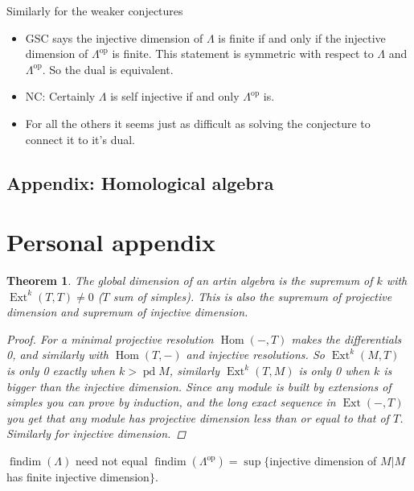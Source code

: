 \documentclass[11pt, a4paper, english]{article}
\newtheorem{theorem}{Theorem}[section]
\theoremstyle{definition}
\DeclareMathOperator{\Hom}{Hom}
\DeclareMathOperator{\Ext}{Ext}
\DeclareMathOperator{\findim}{findim}
\DeclareMathOperator{\pd}{pd}
\begin{document}
Similarly for the weaker conjectures
\begin{itemize}
	\item GSC says the injective dimension of $\Lambda$ is finite if and only if the injective dimension of $\Lambda^{\operatorname{op}}$ is finite. This statement is symmetric with respect to $\Lambda$ and $\Lambda^{\operatorname{op}}$. So the dual is equivalent.
	\item NC: Certainly $\Lambda$ is self injective if and only $\Lambda^{\operatorname{op}}$ is. 
	\item For all the others it seems just as difficult as solving the conjecture to connect it to it's dual.
\end{itemize}

\begin{appendices}
\section{Appendix: Homological algebra}\label{sec:appendix}

\end{appendices}

\section{Personal appendix}
\begin{theorem}
	The global dimension of an artin algebra is the supremum of $k$ with $\Ext^k(T,T)\neq 0$ ($T$ sum of simples). This is also the supremum of projective dimension and supremum of injective dimension.
	\begin{proof}
		For a minimal projective resolution $\Hom(-,T)$ makes the differentials 0, and similarly with $\Hom(T,-)$ and injective resolutions. So $\Ext^k(M, T)$ is only 0 exactly when $k>\pd M$, similarly $\Ext^k(T,M)$ is only 0 when $k$ is bigger than the injective dimension. Since any module is built by extensions of simples you can prove by induction, and the long exact sequence in $\Ext(-,T)$ you get that any module has projective dimension less than or equal to that of $T$. Similarly for injective dimension.
	\end{proof}
\end{theorem}

$\findim(\Lambda)$ need not equal $\findim(\Lambda^{\operatorname{op}}) = \sup\{ $injective dimension of $M | M$ has finite injective dimension$ \}$.
\end{document}
